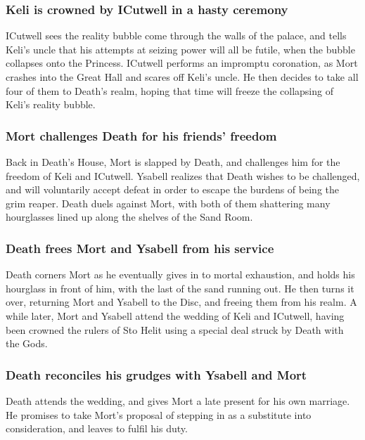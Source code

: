 \subsubsection{\Gls{Keli} is crowned by \Gls{ICutwell} in a hasty ceremony}
\Gls{ICutwell} sees the reality bubble come through the walls of the palace, and tells \Gls{Keli}'s
uncle that his attempts at seizing power will all be futile, when the bubble collapses onto the
Princess. \Gls{ICutwell} performs an impromptu coronation, as \Gls{Mort} crashes into the Great Hall
and scares off \Gls{Keli}'s uncle. He then decides to take all four of them to \Gls{Death}'s realm,
hoping that time will freeze the collapsing of \Gls{Keli}'s reality bubble.

\subsubsection{\Gls{Mort} challenges \Gls{Death} for his friends' freedom}
Back in \Gls{Death}'s House, \Gls{Mort} is slapped by \Gls{Death}, and challenges him for the
freedom of \Gls{Keli} and \Gls{ICutwell}. \Gls{Ysabell} realizes that \Gls{Death} wishes to be
challenged, and will voluntarily accept defeat in order to escape the burdens of being the grim
reaper. \Gls{Death} duels against \Gls{Mort}, with both of them shattering many hourglasses lined
up along the shelves of the Sand Room.

\subsubsection{\Gls{Death} frees \Gls{Mort} and \Gls{Ysabell} from his service}
\Gls{Death} corners \Gls{Mort} as he eventually gives in to mortal exhaustion, and holds his
hourglass in front of him, with the last of the sand running out. He then turns it over, returning
\Gls{Mort} and \Gls{Ysabell} to the Disc, and freeing them from his realm. A while later,
\Gls{Mort} and \Gls{Ysabell} attend the wedding of \Gls{Keli} and \Gls{ICutwell}, having been
crowned the rulers of Sto Helit using a special deal struck by \Gls{Death} with the Gods.

\subsubsection{\Gls{Death} reconciles his grudges with \Gls{Ysabell} and \Gls{Mort}}
\Gls{Death} attends the wedding, and gives \Gls{Mort} a late present for his own marriage. He
promises to take \Gls{Mort}'s proposal of stepping in as a substitute into consideration, and leaves
to fulfil his duty.